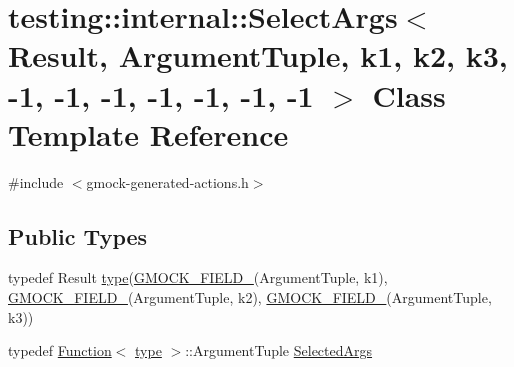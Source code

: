 \hypertarget{classtesting_1_1internal_1_1_select_args_3_01_result_00_01_argument_tuple_00_01k1_00_01k2_00_01k43121451b69bc30ee1dad887e67d8807}{}\section{testing\+::internal\+::Select\+Args$<$ Result, Argument\+Tuple, k1, k2, k3, -\/1, -\/1, -\/1, -\/1, -\/1, -\/1, -\/1 $>$ Class Template Reference}
\label{classtesting_1_1internal_1_1_select_args_3_01_result_00_01_argument_tuple_00_01k1_00_01k2_00_01k43121451b69bc30ee1dad887e67d8807}


{\ttfamily \#include $<$gmock-\/generated-\/actions.\+h$>$}

\subsection*{Public Types}
\begin{DoxyCompactItemize}
\item 
typedef Result \mbox{\hyperlink{classtesting_1_1internal_1_1_select_args_3_01_result_00_01_argument_tuple_00_01k1_00_01k2_00_01k43121451b69bc30ee1dad887e67d8807_ad8ecea11407ad5d56b86e33af853f265}{type}}(\mbox{\hyperlink{_obj__test_2lib_2googletest-release-1_88_81_2googlemock_2include_2gmock_2gmock-generated-actions_8h_a6eb3ce92b0613603057a20ec9e593317}{G\+M\+O\+C\+K\+\_\+\+F\+I\+E\+L\+D\+\_\+}}(Argument\+Tuple, k1), \mbox{\hyperlink{_obj__test_2lib_2googletest-release-1_88_81_2googlemock_2include_2gmock_2gmock-generated-actions_8h_a6eb3ce92b0613603057a20ec9e593317}{G\+M\+O\+C\+K\+\_\+\+F\+I\+E\+L\+D\+\_\+}}(Argument\+Tuple, k2), \mbox{\hyperlink{_obj__test_2lib_2googletest-release-1_88_81_2googlemock_2include_2gmock_2gmock-generated-actions_8h_a6eb3ce92b0613603057a20ec9e593317}{G\+M\+O\+C\+K\+\_\+\+F\+I\+E\+L\+D\+\_\+}}(Argument\+Tuple, k3))
\item 
typedef \mbox{\hyperlink{structtesting_1_1internal_1_1_function}{Function}}$<$ \mbox{\hyperlink{classtesting_1_1internal_1_1_select_args_3_01_result_00_01_argument_tuple_00_01k1_00_01k2_00_01k43121451b69bc30ee1dad887e67d8807_ad8ecea11407ad5d56b86e33af853f265}{type}} $>$\+::Argument\+Tuple \mbox{\hyperlink{classtesting_1_1internal_1_1_select_args_3_01_result_00_01_argument_tuple_00_01k1_00_01k2_00_01k43121451b69bc30ee1dad887e67d8807_a6780fe203ee6f054ad07b84d9ec68dfd}{Selected\+Args}}
\end{DoxyCompactItemize}
